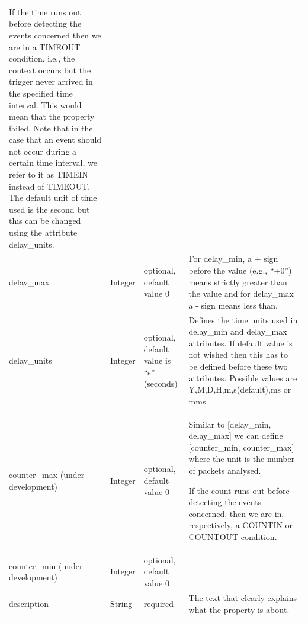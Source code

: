 \begin{table}[H]
\begin{adjustwidth}{-2in}{-.5in}
\begin{center}
\begin{supertabular}{|m{1.0281599in}|m{1.0281599in}|m{1.0281599in}|m{3.44206in}|}
If the time runs out before detecting the events concerned then we are
in a TIMEOUT condition, i.e., the context occurs but the trigger never arrived in the specified time interval. This would mean that the property failed.  
Note that in the case that an event should not occur during a certain time interval, we refer to it as TIMEIN instead of TIMEOUT.
The default unit of time used is the second but this can be changed using the attribute delay\_units.
\\\hhline{---~}
delay\_max &
Integer &
optional, default value 0 &
For delay\_min, a + sign before the value (e.g.,  {\textquotedblleft}+0{\textquotedblright}) means strictly greater than the value and for delay\_max a - sign means less than.
\\\hline
delay\_units &
Integer &
optional, default value is {\textquotedblleft}s{\textquotedblright} (seconds) &
Defines the time units used in delay\_min and delay\_max attributes. If default value is not wished then this has to be defined before these two attributes. Possible values are Y,M,D,H,m,s(default),ms or mms.
\\\hline
counter\_max (under development)&
Integer &
optional, default value 0 &
Similar to [delay\_min, delay\_max] we can define [counter\_min,
counter\_max] where the unit is the number of packets analysed. 

If the count runs out before detecting the events concerned, then we are
in, respectively, a COUNTIN or COUNTOUT condition.
\\\hhline{---~}
counter\_min (under development)&
Integer &
optional, default value 0 &
\\\hline
description &
String &
required &
The text that clearly explains what the property is about.\\
\hline
\end{supertabular}
        \end{center}
    \end{adjustwidth}
\end{table}


